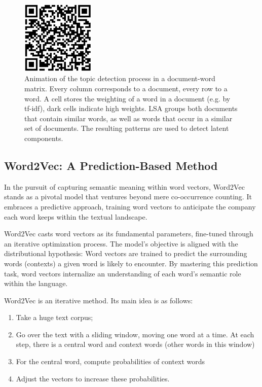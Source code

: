 \documentclass{report}
\begin{document}
\begin{figure}
	\includegraphics[width=100pt]{57}
	\centering
	\caption{Animation of the topic detection process in a document-word matrix. Every column corresponds to a document, every row to a word. A cell stores the weighting of a word in a document (e.g. by tf-idf), dark cells indicate high weights. LSA groups both documents that contain similar words, as well as words that occur in a similar set of documents. The resulting patterns are used to detect latent components.}
\end{figure}


\subsection{Word2Vec: A Prediction-Based Method}
In the pursuit of capturing semantic meaning within word vectors, Word2Vec stands as a pivotal model that ventures beyond mere co-occurrence counting. It embraces a predictive approach, training word vectors to anticipate the company each word keeps within the textual landscape.

Word2Vec casts word vectors as its fundamental parameters, fine-tuned through an iterative optimization process. The model's objective is aligned with the distributional hypothesis: Word vectors are trained to predict the surrounding words (contexts) a given word is likely to encounter. By mastering this prediction task, word vectors internalize an understanding of each word's semantic role within the language.

Word2Vec is an iterative method. Its main idea is as follows:
\begin{enumerate}
	\item Take a huge text corpus;
	\item Go over the text with a sliding window, moving one word at a time. At each step, there is a central word and context words (other words in this window)
\item For the central word, compute probabilities of context words
\item Adjust the vectors to increase these probabilities.
\end{enumerate}
\end{document}
